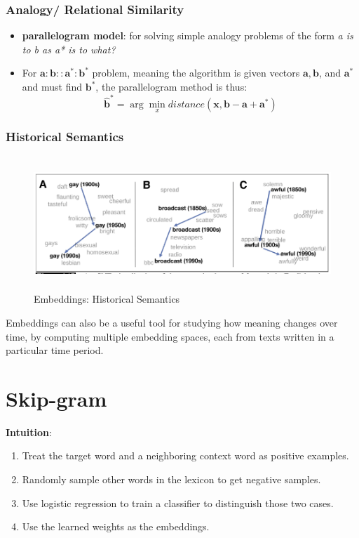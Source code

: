 \subsubsection{Analogy/ Relational Similarity \cite{nlp-1}}\label{Analogy/ Relational Similarity}
\begin{itemize}
    \item \textbf{parallelogram model}: for solving simple analogy problems of the form \textit{a is to b as a* is to what?}

    \item For $\mathbf{a : b :: a^*: b^*}$ problem, meaning the algorithm is given vectors $\mathbf{a, b}$, and $\mathbf{a^*}$ and must find $\mathbf{b^*}$, the parallelogram method is thus:
    \[
        \hat{\mathbf{b}}^* = \arg\min_x distance(\mathbf{x,b-a+a^*})
    \]

    
\end{itemize}

\subsubsection{Historical Semantics \cite{nlp-1}}\label{Embeddings: Historical Semantics}

\begin{figure}[h]
    \centering
    \includegraphics[width=0.6\linewidth, height=5cm, keepaspectratio]{Pictures/info-retrieval/embedding-historical-semantics.png}
    \caption{Embeddings: Historical Semantics}
\end{figure}

Embeddings can also be a useful tool for studying how meaning changes over time, by computing multiple embedding spaces, each from texts written in a particular time period.




\section{Skip-gram \cite{nlp-1}}\label{Skip-gram}
\textbf{Intuition}:
\begin{enumerate}
    \item Treat the target word and a neighboring context word as positive examples.
    \item Randomly sample other words in the lexicon to get negative samples.
    \item Use logistic regression to train a classifier to distinguish those two cases.
    \item Use the learned weights as the embeddings.
\end{enumerate}

